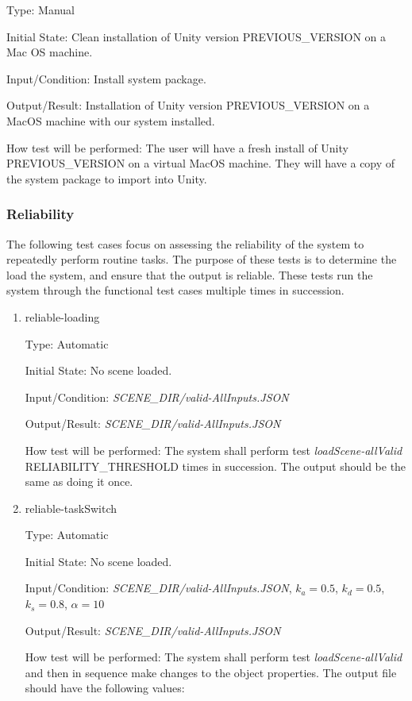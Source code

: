 \documentclass[12pt, titlepage]{article}
\begin{document}
\begin{enumerate}
Type: Manual

Initial State: Clean installation of Unity version PREVIOUS\_VERSION on a Mac 
OS machine.

Input/Condition: Install system package.

Output/Result: Installation of Unity version PREVIOUS\_VERSION on a 
MacOS machine with our system installed.

How test will be performed: The user will have a fresh install of Unity 
PREVIOUS\_VERSION on a virtual MacOS machine. They will have a copy of the 
system package to import into Unity.

\end{enumerate}

\subsubsection{Reliability}
The following test cases focus on assessing the reliability of the system to 
repeatedly perform routine tasks. The purpose of these tests is to determine 
the load the system, and ensure that the output is reliable. These tests run 
the system through the functional test cases multiple times in succession.

\begin{enumerate}
	
	\item{reliable-loading\\}
	
	Type: Automatic
	
	Initial State: No scene loaded.
	
	Input/Condition: \textit{SCENE\_DIR/valid-AllInputs.JSON}
	
	Output/Result: \textit{SCENE\_DIR/valid-AllInputs.JSON}
	
	How test will be performed: The system shall perform test 
	\textit{loadScene-allValid} RELIABILITY\_THRESHOLD times in succession. The 
	output should be the same as doing it once.

	\item{reliable-taskSwitch\\}
	
	Type: Automatic
	
	Initial State: No scene loaded.
	
	Input/Condition: \textit{SCENE\_DIR/valid-AllInputs.JSON}, $k_{a} = 0.5$, 
	$k_{d} = 0.5$, $k_{s} = 0.8$, $\alpha = 10$
	
	Output/Result: \textit{SCENE\_DIR/valid-AllInputs.JSON}
	
	How test will be performed: The system shall perform test 
	\textit{loadScene-allValid} and then in sequence make changes to the object 
	properties. The output file should have the following values:

\end{enumerate}
\end{document}
